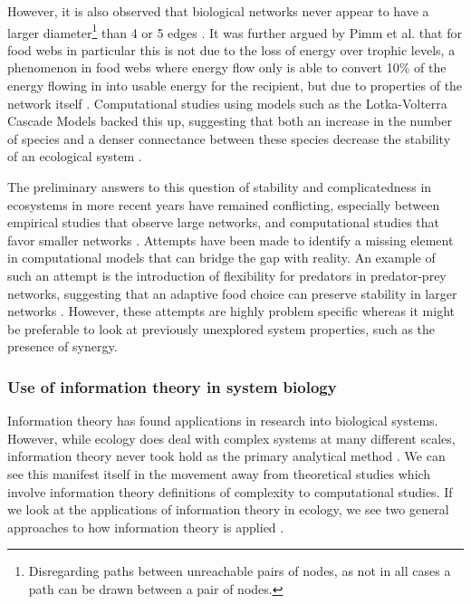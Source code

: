 \documentclass[../main.tex]{subfiles}
\begin{document}
However, it is also observed that biological networks never appear to have a larger diameter\footnote{Disregarding paths between unreachable pairs of nodes, as not in all cases a path can be drawn between a pair of nodes.} than 4 or 5 edges \cite{pimm1977number}.
It was further argued by Pimm et al. that for food webs in particular this is not due to the loss of energy over trophic levels, a phenomenon in food webs where energy flow only is able to convert 10\% of the energy flowing in into usable energy for the recipient, but due to properties of the network itself \cite{pimm1977number}.
Computational studies using models such as the Lotka-Volterra Cascade Models backed this up, suggesting that both an increase in the number of species and a denser connectance between these species decrease the stability of an ecological system \cite{chen2001global}.

The preliminary answers to this question of stability and complicatedness in ecosystems in more recent years have remained conflicting, especially between empirical studies that observe large networks, and computational studies that favor smaller networks \cite{pimm1984complexity}.
Attempts have been made to identify a missing element in computational models that can bridge the gap with reality.
An example of such an attempt is the introduction of flexibility for predators in predator-prey networks, suggesting that an adaptive food choice can preserve stability in larger networks \cite{kondoh2003foraging}.
However, these attempts are highly problem specific whereas it might be preferable to look at previously unexplored system properties, such as the presence of synergy. %

\subsubsection{Use of information theory in system biology}

Information theory has found applications in research into biological systems.
However, while ecology does deal with complex systems at many different scales, information theory never took hold as the primary analytical method \cite{ulanowicz2001information}. %
We can see this manifest itself in the movement away from theoretical studies which involve information theory definitions of complexity to computational studies.
If we look at the applications of information theory in ecology, we see two general approaches to how information theory is applied \cite{ulanowicz2001information}.
\end{document}
